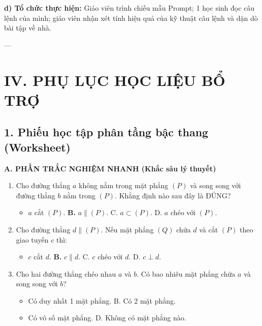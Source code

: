 \documentclass[12pt, a4paper]{article}
\begin{document}
\noindent \textbf{d) Tổ chức thực hiện:}
Giáo viên trình chiếu mẫu Prompt; 1 học sinh đọc câu lệnh của mình; giáo viên nhận xét tính hiệu quả của kỹ thuật câu lệnh và dặn dò bài tập về nhà.

---

\section*{IV. PHỤ LỤC HỌC LIỆU BỔ TRỢ}

\subsection*{1. Phiếu học tập phân tầng bậc thang (Worksheet)}

\noindent \textbf{A. PHẦN TRẮC NGHIỆM NHANH (Khắc sâu lý thuyết)}
\begin{enumerate}[leftmargin=0.6cm]
    \item Cho đường thẳng $a$ không nằm trong mặt phẳng $(P)$ và song song với đường thẳng $b$ nằm trong $(P)$. Khẳng định nào sau đây là ĐÚNG?
    \begin{itemize}[leftmargin=0.6cm]
        \item[A.] $a$ cắt $(P)$. \quad \textbf{B.} $a \parallel (P)$. \quad C. $a \subset (P)$. \quad D. $a$ chéo với $(P)$.
    \end{itemize}
    \item Cho đường thẳng $d \parallel (P)$. Nếu mặt phẳng $(Q)$ chứa $d$ và cắt $(P)$ theo giao tuyến $c$ thì:
    \begin{itemize}[leftmargin=0.6cm]
        \item[A.] $c$ cắt $d$. \quad \textbf{B.} $c \parallel d$. \quad C. $c$ chéo với $d$. \quad D. $c \perp d$.
    \end{itemize}
    \item Cho hai đường thẳng chéo nhau $a$ và $b$. Có bao nhiêu mặt phẳng chứa $a$ và song song với $b$?
    \begin{itemize}[leftmargin=0.6cm]
        \item[\textbf{A.}] Có duy nhất 1 mặt phẳng. \quad B. Có 2 mặt phẳng.
        \item[C.] Có vô số mặt phẳng. \quad D. Không có mặt phẳng nào.
    \end{itemize}
\end{enumerate}
\end{document}
